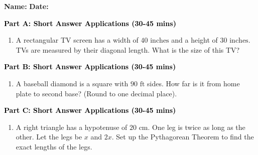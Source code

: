 \documentclass[12pt, letterpaper, fleqn]{article}
\begin{document}
\textbf{Name:} \underline{\hspace{5cm}}
\hfill
\textbf{Date:} \underline{\hspace{3cm}}\\


\begin{tcolorbox}[colback=customteal!20]
\large\textcolor{black}{\textbf{Part A: Short Answer Applications (30-45 mins)}}
\end{tcolorbox}

\vspace{3mm}

\begin{enumerate}[itemsep=4.2cm, leftmargin=0.6cm]
\item A rectangular TV screen has a width of $40\text{ inches}$ and a height of $30\text{ inches}$. TVs are measured by their diagonal length. What is the size of this TV?
\end{enumerate}

\newpage

\begin{tcolorbox}[colback=customteal!20]
\large\textcolor{black}{\textbf{Part B: Short Answer Applications (30-45 mins)}}
\end{tcolorbox}

\vspace{3mm}

\begin{enumerate}[itemsep=4.2cm, leftmargin=0.6cm, resume]
\item A baseball diamond is a square with $90\text{ ft}$ sides. How far is it from home plate to second base? (Round to one decimal place).
\end{enumerate}

\newpage

\begin{tcolorbox}[colback=customteal!20]
\large\textcolor{black}{\textbf{Part C: Short Answer Applications (30-45 mins)}}
\end{tcolorbox}

\vspace{3mm}

\begin{enumerate}[itemsep=4.2cm, leftmargin=0.6cm, resume]
\item A right triangle has a hypotenuse of $20\text{ cm}$. One leg is twice as long as the other. Let the legs be $x$ and $2x$. Set up the Pythagorean Theorem to find the exact lengths of the legs.
\end{enumerate}
\end{document}

